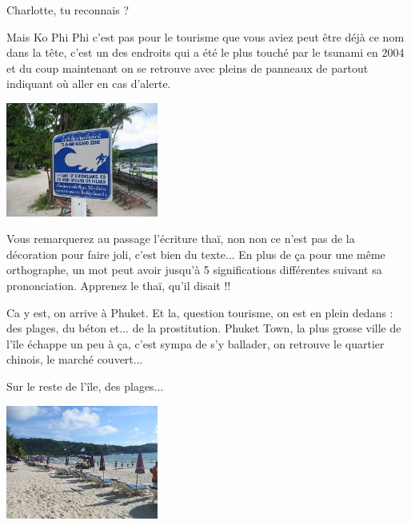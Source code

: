 \begin{multicols}{2}
Charlotte, tu reconnais ?

Mais Ko Phi Phi c'est pas pour le tourisme que vous aviez peut être déjà ce nom dans la tête, c'est un des endroits qui a été le plus touché par le tsunami en 2004 et du coup maintenant on se retrouve avec pleins de panneaux de partout indiquant où aller en cas d'alerte.

\smallbreak
\hspace*{-0.65cm}
\includegraphics[width=5cm]{articles/Phucket/12121623755piH.jpg}
\smallbreak

Vous remarquerez au passage l'écriture thaï, non non ce n'est pas de la décoration pour faire joli, c'est bien du texte... En plus de ça pour une même orthographe, un mot peut avoir jusqu'à 5 significations différentes suivant sa prononciation. Apprenez le thaï, qu'il disait !!

Ca y est, on arrive à Phuket. Et la, question tourisme, on est en plein dedans : des plages, du béton et... de la prostitution. Phuket Town, la plus grosse ville de l'île échappe un peu à ça, c'est sympa de s'y ballader, on retrouve le quartier chinois, le marché couvert...


Sur le reste de l'île, des plages...

\smallbreak
\hspace*{-0.65cm}
\includegraphics[width=5cm]{articles/Phucket/1212162370ANUw.jpg}
\smallbreak


\end{multicols}
